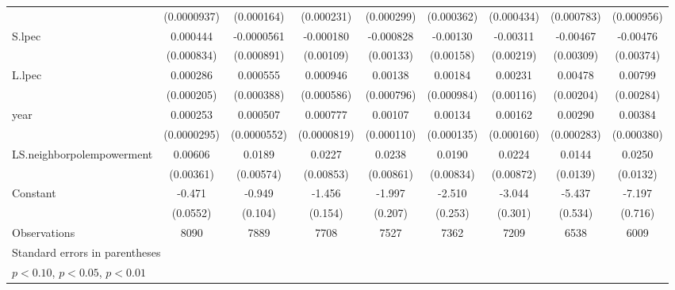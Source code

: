 \begin{table}[htbp]
\begin{tabular}{l*{8}{c}}
                    & (0.0000937)         &  (0.000164)         &  (0.000231)         &  (0.000299)         &  (0.000362)         &  (0.000434)         &  (0.000783)         &  (0.000956)         \\
[1em]
S.lpec              &    0.000444         &  -0.0000561         &   -0.000180         &   -0.000828         &    -0.00130         &    -0.00311         &    -0.00467         &    -0.00476         \\
                    &  (0.000834)         &  (0.000891)         &   (0.00109)         &   (0.00133)         &   (0.00158)         &   (0.00219)         &   (0.00309)         &   (0.00374)         \\
[1em]
L.lpec              &    0.000286         &    0.000555         &    0.000946         &     0.00138\sym{*}  &     0.00184\sym{*}  &     0.00231\sym{**} &     0.00478\sym{**} &     0.00799\sym{***}\\
                    &  (0.000205)         &  (0.000388)         &  (0.000586)         &  (0.000796)         &  (0.000984)         &   (0.00116)         &   (0.00204)         &   (0.00284)         \\
[1em]
year                &    0.000253\sym{***}&    0.000507\sym{***}&    0.000777\sym{***}&     0.00107\sym{***}&     0.00134\sym{***}&     0.00162\sym{***}&     0.00290\sym{***}&     0.00384\sym{***}\\
                    & (0.0000295)         & (0.0000552)         & (0.0000819)         &  (0.000110)         &  (0.000135)         &  (0.000160)         &  (0.000283)         &  (0.000380)         \\
[1em]
LS.neighborpolempowerment&     0.00606\sym{*}  &      0.0189\sym{***}&      0.0227\sym{***}&      0.0238\sym{***}&      0.0190\sym{**} &      0.0224\sym{**} &      0.0144         &      0.0250\sym{*}  \\
                    &   (0.00361)         &   (0.00574)         &   (0.00853)         &   (0.00861)         &   (0.00834)         &   (0.00872)         &    (0.0139)         &    (0.0132)         \\
[1em]
Constant            &      -0.471\sym{***}&      -0.949\sym{***}&      -1.456\sym{***}&      -1.997\sym{***}&      -2.510\sym{***}&      -3.044\sym{***}&      -5.437\sym{***}&      -7.197\sym{***}\\
                    &    (0.0552)         &     (0.104)         &     (0.154)         &     (0.207)         &     (0.253)         &     (0.301)         &     (0.534)         &     (0.716)         \\
\hline
Observations        &        8090         &        7889         &        7708         &        7527         &        7362         &        7209         &        6538         &        6009         \\
\hline\hline
\multicolumn{9}{l}{\footnotesize Standard errors in parentheses}\\
\multicolumn{9}{l}{\footnotesize \sym{*} \(p<0.10\), \sym{**} \(p<0.05\), \sym{***} \(p<0.01\)}\\
\end{tabular}
\end{table}
